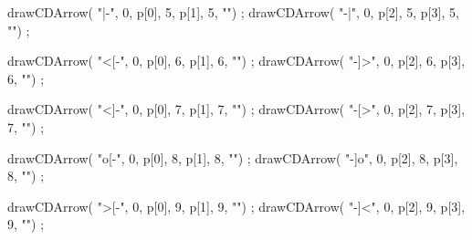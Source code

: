 drawCDArrow(   "|-", 0, p[0], 5, p[1], 5, "") ;
drawCDArrow(   "-|", 0, p[2], 5, p[3], 5, "") ;

drawCDArrow(   "<[-", 0, p[0], 6, p[1], 6, "") ;
drawCDArrow(   "-]>", 0, p[2], 6, p[3], 6, "") ;

drawCDArrow(   "<]-", 0, p[0], 7, p[1], 7, "") ;
drawCDArrow(   "-[>", 0, p[2], 7, p[3], 7, "") ;

drawCDArrow(   "o[-", 0, p[0], 8, p[1], 8, "") ;
drawCDArrow(   "-]o", 0, p[2], 8, p[3], 8, "") ;

drawCDArrow(   ">[-", 0, p[0], 9, p[1], 9, "") ;
drawCDArrow(   "-]<", 0, p[2], 9, p[3], 9, "") ;



\stopMPpage